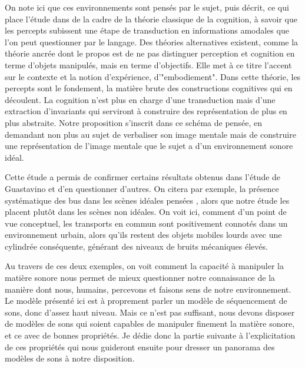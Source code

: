On note ici que ces environnements sont pensés par le sujet, puis décrit, ce qui place l'étude dans de la cadre de la théorie classique de la cognition, à savoir que les percepts subissent une étape de transduction en informations amodales que l'on peut questionner par le langage. Des théories alternatives existent, comme la théorie ancrée \cite{barsalou2010grounded} dont le propos est de ne pas distinguer perception et cognition en terme d'objets manipulés, mais en terme d'objectifs. Elle met à ce titre l'accent sur le contexte et la notion d'expérience, d'"embodiement". Dans cette théorie, les percepts sont le fondement, la matière brute des constructions cognitives qui en découlent. La cognition n'est plus en charge d'une transduction mais d'une extraction d'invariants qui serviront à construire des représentation de plus en plus abstraite. Notre proposition s'inscrit dans ce schéma de pensée, en demandant non plus au sujet de verbaliser son image mentale mais de \og construire \fg une représentation de l'image mentale que le sujet a d'un environnement sonore idéal.

Cette étude a permis de confirmer certains résultats obtenus dans l'étude de Guastavino \cite{guastavino2006ideal} et d'en questionner d'autres. On citera par exemple, la présence systématique des bus dans les scènes idéales \og pensées \fg, alors que notre étude les placent plutôt dans les scènes non idéales. On voit ici, comment d'un point de vue conceptuel, les transports en commun sont positivement connotés dans un environnement urbain, alors qu'ils restent des objets mobiles lourds avec une cylindrée conséquente, générant des niveaux de bruits mécaniques élevés\cite{lafayhal-01300399}.

Au travers de ces deux exemples, on voit comment la capacité à manipuler la matière sonore nous permet de mieux questionner notre connaissance de la manière dont nous, humains, percevons et faisons sens de notre environnement. Le modèle présenté ici est à proprement parler un modèle de séquencement de sons, donc d'assez haut niveau. Mais ce n'est pas suffisant, nous devons disposer de modèles de sons qui soient capables de manipuler finement la matière sonore, et ce avec de bonnes propriétés. Je dédie donc la partie suivante à l'explicitation de ces propriétés qui nous guideront ensuite pour dresser un panorama des modèles de sons à notre disposition.
